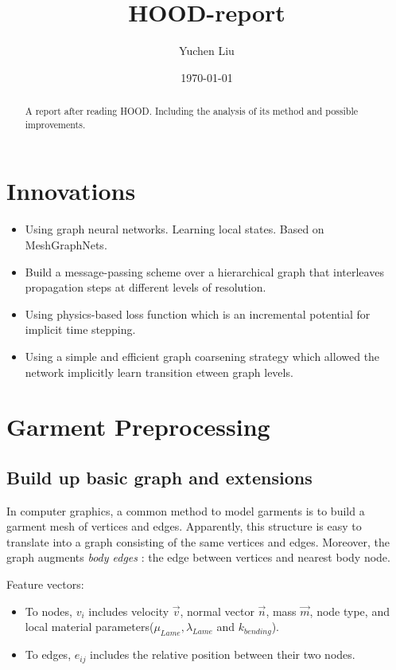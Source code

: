 \documentclass{article}
\title{HOOD-report}
\author{Yuchen Liu}
\date{\today}
\begin{document}
\maketitle
\tableofcontents
\begin{abstract}
    A report after reading HOOD\cite{grigorev2023hood}. Including the analysis of its method and possible improvements.
\end{abstract}
\newpage
\section{Innovations}
\begin{itemize}
    \item Using graph neural networks. Learning local states. Based on MeshGraphNets\cite{pfaff2021learning}.
    \item Build a message-passing scheme over a hierarchical graph that interleaves propagation steps at different levels of resolution.
    \item Using physics-based loss function which is an incremental potential for implicit time stepping.
    \item Using a simple and efficient graph coarsening strategy which allowed the network implicitly learn transition etween graph levels.
\end{itemize}

\section{Garment Preprocessing}
\subsection{Build up basic graph and extensions}
\par In computer graphics, a common method to model garments is to build a garment mesh of vertices and edges. Apparently, this structure is easy to translate into a graph consisting of the same vertices and edges. Moreover, the graph augments \textit{body edges} : the edge between vertices and nearest body node.
\par Feature vectors:
\begin{itemize}
    \item To nodes, $v_i$ includes velocity $\vec{v}$, normal vector $\vec{n}$, mass $\vec{m}$, node type, and local material parameters($\mu_{Lame}, \lambda_{Lame}$ and $k_{bending} $).
    \item To edges, $e_{ij}$ includes the relative position between their two nodes.
\end{itemize}
\par 
\end{document}
